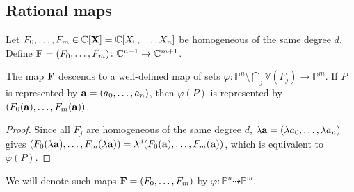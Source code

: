 \subsection{Rational maps}
Let \( F_0, \dots, F_m \in \mathbb C[\vb X] = \mathbb C[X_0, \dots, X_n] \) be homogeneous of the same degree \( d \).
Define \( \vb F = (F_0, \dots, F_m) \colon \mathbb C^{n+1} \to \mathbb C^{m+1} \).
\begin{proposition}
    The map \( \vb F \) descends to a well-defined map of sets \( \varphi \colon \mathbb P^n \setminus \bigcap_j \mathbb V(F_j) \to \mathbb P^m \).
    If \( P \) is represented by \( \vb a = (a_0, \dots, a_n) \), then \( \varphi(P) \) is represented by \( (F_0(\vb a), \dots, F_m(\vb a)) \).
\end{proposition}
\begin{proof}
    Since all \( F_j \) are homogeneous of the same degree \( d \), \( \lambda \vb a = (\lambda a_0, \dots, \lambda a_n) \) gives \( (F_0(\lambda\vb a), \dots, F_m(\lambda \vb a)) = \lambda^d (F_0(\vb a), \dots, F_m(\vb a)) \), which is equivalent to \( \varphi(P) \).
\end{proof}
We will denote such maps \( \vb F = (F_0, \dots, F_m) \) by \( \varphi \colon \mathbb P^n \dashrightarrow \mathbb P^m \).

